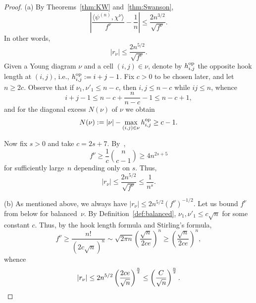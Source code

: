 \documentclass[12pt]%
{amsart}
\newcommand{\bbn}{\mathbb{N}}
\newcommand{\Lie}{\operatorname{Lie}}
\theoremstyle{plain}
\theoremstyle{definition}
\theoremstyle{remark}
\newcommand{\todo}[1]{\vspace{5 mm}\par \noindent
	\marginpar{\textsc{ToDo}} \framebox{\begin{minipage}[c]{0.95
				\textwidth}
			#1 \end{minipage}}\vspace{5 mm}\par}
\begin{document}
\begin{proof}
    (a) %
    By Theorems~\ref{thm:KW} and~\ref{thm:Swanson},
    \[
        \left| \frac{\langle \psi^{(n)},\chi^{\nu} \rangle}{f^\nu}-\frac{1}{n} \right|
        \le \frac{2n^{3/2}}{\sqrt {f^\nu}}.
    \]	
    In other words,
    \[
        |r_\nu| \le \frac{2n^{5/2}}{\sqrt {f^\nu}}.
    \]
    Given a Young diagram $\nu$ and a cell $(i,j)\in\nu$, denote by $h_{i,j}^{\rm op}$ the opposite hook length at $(i,j)$, i.e., $h_{i,j}^{\rm op}:=i+j-1$. Fix $c>0$ to be chosen later, and let $n\ge 2c$.
    Observe that if $\nu_1,\nu'_1\le n-c$, then $i,j\le n-c$ while $ij\le n$, whence
    \[
        i+j-1\le n-c+\frac n{n-c}-1\le n-c+1,
    \] 
    and for the diagonal excess $N(\nu)$ of $\nu$ we obtain 
    \[  
        N(\nu):=|\nu|-\max\limits_{(i,j)\in\nu}h_{i,j}^{\rm op}\ge c-1.
    \]

    Now fix $s>0$ and take $c=2s+7$.
    By~\cite[Corollary 4.13]{Swanson}, 
    \[
        f^\nu
        \ge \frac{1}{c} \binom{n}{c-1}
        \ge 4 n^{2s+5}
    \]
    for sufficiently large~$n$ depending only on $s$. Thus, 
    \[
        |r_\nu| \le \frac{2n^{5/2}}{\sqrt {f^\nu}}
        \le \frac1{n^s}.
    \]
    

    (b) %
    As mentioned above, we always have $|r_\nu|\le 2n^{5/2}(f^\nu)^{-1/2}$. Let us bound $f^\nu$ from below for balanced~$\nu$. By Definition~\ref{def:balanced}, $\nu_1,\nu'_1\le c\sqrt n$ for some constant $c$. Thus, by the hook length formula and Stirling's formula,
    \[
        f^\nu\ge\frac{n!}{(2c\sqrt n)^n}
        \sim \sqrt{2\pi n}\left(\frac{\sqrt n}{2ce}\right)^n
        \ge \left( \frac{\sqrt n}{2ce} \right)^n, 
    \]
    whence
    \[
        |r_\nu|
        \le 2n^{5/2} \left( \frac{2ce}{\sqrt n} \right)^{\frac n2}
        \le \left( \frac{C}{\sqrt n} \right)^\frac n2.
     \qedhere
    \]
\end{proof}
\end{document}

